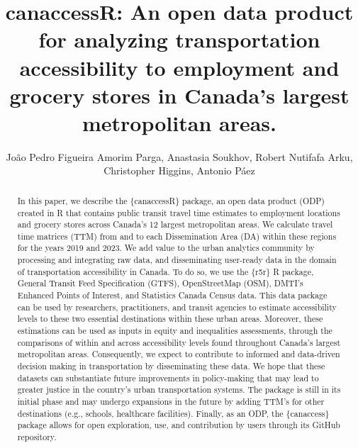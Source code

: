 \documentclass[Royal,times,sageh]{sagej}
\begin{document}

\title{canaccessR: An open data product for analyzing transportation
accessibility to employment and grocery stores in Canada's largest
metropolitan areas.}

\runninghead{}

\author{João Pedro Figueira Amorim Parga\affilnum{}, Anastasia
Soukhov\affilnum{}, Robert Nutifafa Arku\affilnum{}, Christopher
Higgins\affilnum{}, Antonio Páez\affilnum{}}

\affiliation{}



\begin{abstract}
In this paper, we describe the \{canaccessR\} package, an open data
product (ODP) created in R that contains public transit travel time
estimates to employment locations and grocery stores across Canada's 12
largest metropolitan areas. We calculate travel time matrices (TTM) from
and to each Dissemination Area (DA) within these regions for the years
2019 and 2023. We add value to the urban analytics community by
processing and integrating raw data, and disseminating user-ready data
in the domain of transportation accessibility in Canada. To do so, we
use the \{r5r\} R package, General Transit Feed Specification (GTFS),
OpenStreetMap (OSM), DMTI's Enhanced Points of Interest, and Statistics
Canada Census data. This data package can be used by researchers,
practitioners, and transit agencies to estimate accessibility levels to
these two essential destinations within these urban areas. Moreover,
these estimations can be used as inputs in equity and inequalities
assessments, through the comparisons of within and across accessibility
levels found throughout Canada's largest metropolitan areas.
Consequently, we expect to contribute to informed and data-driven
decision making in transportation by disseminating these data. We hope
that these datasets can substantiate future improvements in
policy-making that may lead to greater justice in the country's urban
transportation systems. The package is still in its initial phase and
may undergo expansions in the future by adding TTM's for other
destinations (e.g., schools, healthcare facilities). Finally, as an ODP,
the \{canaccess\} package allows for open exploration, use, and
contribution by users through its GitHub repository.
\end{abstract}

\end{document}
